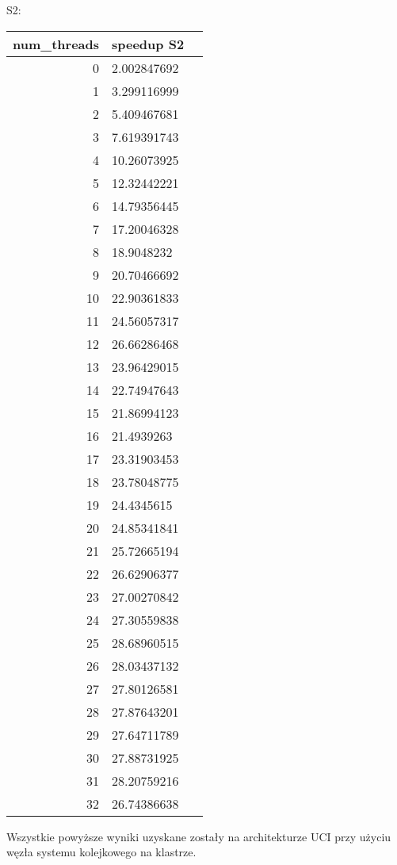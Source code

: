 \documentclass[a4paper,12pt]{scrartcl}
\begin{document}
S2:\\
\begin{tabular}{|r|l|l|}
num\_threads & speedup S2 \\  \hline 
0  & 2.002847692  \\ \hline 
1  & 3.299116999  \\ \hline 
2  & 5.409467681  \\ \hline
3  & 7.619391743  \\ \hline
4  & 10.26073925  \\ \hline
5  & 12.32442221  \\ \hline
6  & 14.79356445  \\ \hline
7  & 17.20046328  \\ \hline
8  & 18.9048232  \\ \hline
9  & 20.70466692  \\ \hline
10 & 22.90361833  \\ \hline
11 & 24.56057317  \\ \hline
12 & 26.66286468  \\ \hline
13 & 23.96429015  \\ \hline
14 & 22.74947643  \\ \hline
15 & 21.86994123  \\ \hline
16 & 21.4939263  \\ \hline
17 & 23.31903453  \\ \hline
18 & 23.78048775  \\ \hline
19 & 24.4345615  \\ \hline
20 & 24.85341841  \\ \hline
21 & 25.72665194  \\ \hline
22 & 26.62906377  \\ \hline
23 & 27.00270842  \\ \hline
24 & 27.30559838  \\ \hline
25 & 28.68960515  \\ \hline
26 & 28.03437132  \\ \hline
27 & 27.80126581  \\ \hline
28 & 27.87643201  \\ \hline
29 & 27.64711789  \\ \hline
30 & 27.88731925  \\ \hline
31 & 28.20759216  \\ \hline
32 & 26.74386638  \\ \hline
\end{tabular} 

Wszystkie powyższe wyniki uzyskane zostały na architekturze UCI przy użyciu węzła systemu kolejkowego na klastrze.
\end{document}
